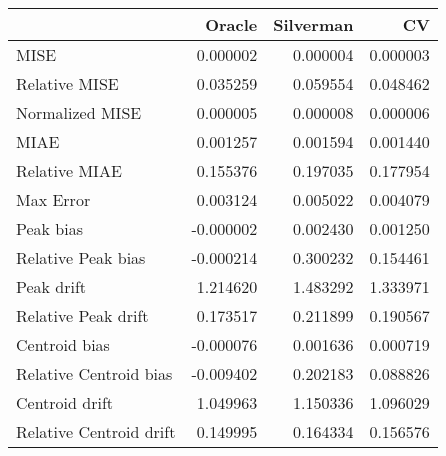 \begin{tabular}{lrrr}
  \hline
 & Oracle & Silverman & CV \\ 
  \hline
MISE & 0.000002 & 0.000004 & 0.000003 \\ 
  Relative MISE & 0.035259 & 0.059554 & 0.048462 \\ 
  Normalized MISE & 0.000005 & 0.000008 & 0.000006 \\ 
  MIAE & 0.001257 & 0.001594 & 0.001440 \\ 
  Relative MIAE & 0.155376 & 0.197035 & 0.177954 \\ 
  Max Error & 0.003124 & 0.005022 & 0.004079 \\ 
  Peak bias & -0.000002 & 0.002430 & 0.001250 \\ 
  Relative Peak bias & -0.000214 & 0.300232 & 0.154461 \\ 
  Peak drift & 1.214620 & 1.483292 & 1.333971 \\ 
  Relative Peak drift & 0.173517 & 0.211899 & 0.190567 \\ 
  Centroid bias & -0.000076 & 0.001636 & 0.000719 \\ 
  Relative Centroid bias & -0.009402 & 0.202183 & 0.088826 \\ 
  Centroid drift & 1.049963 & 1.150336 & 1.096029 \\ 
  Relative Centroid drift & 0.149995 & 0.164334 & 0.156576 \\ 
   \hline
\end{tabular}
